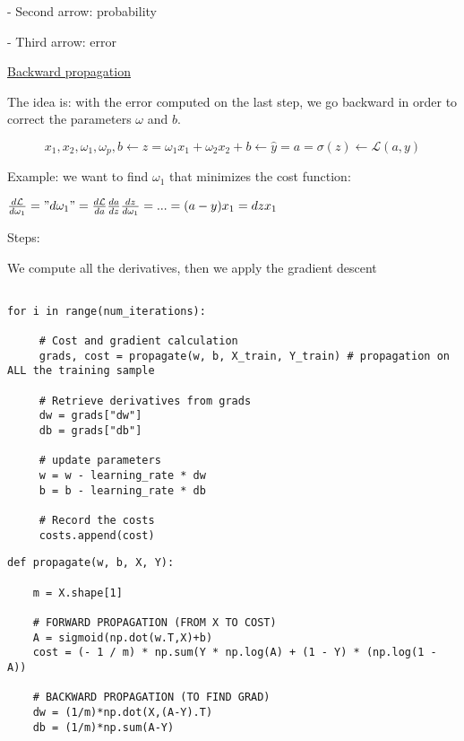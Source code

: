 - Second arrow: probability

- Third arrow: error

\vspace{5mm}

\underline{Backward propagation}

The idea is: with the error computed on the last step, we go backward in order to correct the parameters $\omega$ and $b$.

$$x_1,x_2, \omega_1,\omega_p,b \leftarrow z=\omega_1x_1 + \omega_2x_2 + b \leftarrow \widehat{y}=a=\sigma(z) \leftarrow \mathcal{L}(a,y)$$

Example: we want to find $\omega_1$ that minimizes the cost function:

$\frac{d\mathcal{L}}{d\omega_1}="d\omega_1"=\frac{d\mathcal{L}}{da}\frac{da}{dz}\frac{dz}{d\omega_1}=...=(a-y)x_1=dzx_1$

Steps:

We compute all the derivatives, then we apply the gradient descent

\lstset{language=Python}
\lstset{frame=lines}
\lstset{basicstyle=\footnotesize}
\begin{lstlisting}

for i in range(num_iterations):
        
     # Cost and gradient calculation
     grads, cost = propagate(w, b, X_train, Y_train) # propagation on ALL the training sample
        
     # Retrieve derivatives from grads
     dw = grads["dw"]
     db = grads["db"]
        
     # update parameters
     w = w - learning_rate * dw
     b = b - learning_rate * db
        
     # Record the costs
     costs.append(cost)

\end{lstlisting}

\lstset{language=Python}
\lstset{frame=lines}
\lstset{basicstyle=\footnotesize}
\begin{lstlisting}
def propagate(w, b, X, Y):
    
    m = X.shape[1]
    
    # FORWARD PROPAGATION (FROM X TO COST)
    A = sigmoid(np.dot(w.T,X)+b)
    cost = (- 1 / m) * np.sum(Y * np.log(A) + (1 - Y) * (np.log(1 - A))
    
    # BACKWARD PROPAGATION (TO FIND GRAD)
    dw = (1/m)*np.dot(X,(A-Y).T)
    db = (1/m)*np.sum(A-Y)

\end{lstlisting}



\vspace{5mm}